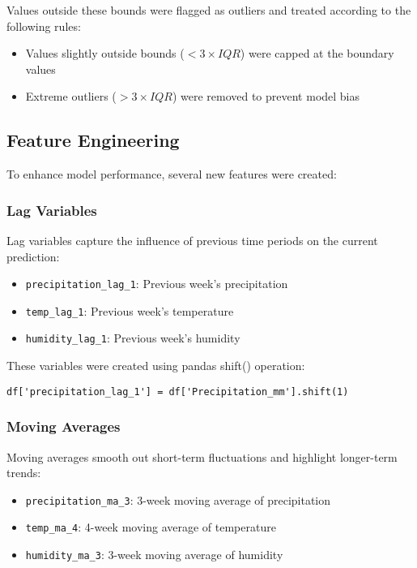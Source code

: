 \documentclass[12pt]{article}
\begin{document}
Values outside these bounds were flagged as outliers and treated according to the following rules:
\begin{itemize}
    \item Values slightly outside bounds ($< 3 \times IQR$) were capped at the boundary values
    \item Extreme outliers ($> 3 \times IQR$) were removed to prevent model bias
\end{itemize}

\subsection{Feature Engineering}
\label{subsec:feature_engineering}

To enhance model performance, several new features were created:

\subsubsection{Lag Variables}
\label{subsubsec:lag_variables}

Lag variables capture the influence of previous time periods on the current prediction:
\begin{itemize}
    \item \texttt{precipitation\_lag\_1}: Previous week's precipitation
    \item \texttt{temp\_lag\_1}: Previous week's temperature
    \item \texttt{humidity\_lag\_1}: Previous week's humidity
\end{itemize}

These variables were created using pandas shift() operation:
\begin{verbatim}
df['precipitation_lag_1'] = df['Precipitation_mm'].shift(1)
\end{verbatim}

\subsubsection{Moving Averages}
\label{subsubsec:moving_averages}

Moving averages smooth out short-term fluctuations and highlight longer-term trends:
\begin{itemize}
    \item \texttt{precipitation\_ma\_3}: 3-week moving average of precipitation
    \item \texttt{temp\_ma\_4}: 4-week moving average of temperature
    \item \texttt{humidity\_ma\_3}: 3-week moving average of humidity
\end{itemize}
\end{document}
